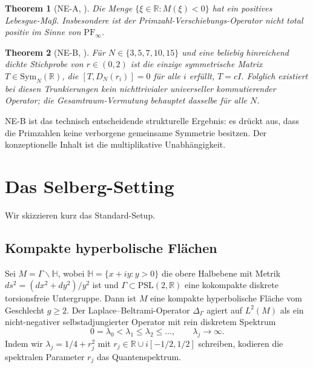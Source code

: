 \documentclass[12pt,a4paper]{article}
\newtheorem{theorem}{Theorem}[section]
\theoremstyle{definition}
\theoremstyle{remark}
\newcommand{\HH}{\mathbb{H}}
\newcommand{\RR}{\mathbb{R}}
\newcommand{\Delop}{\Delta_{\Gamma}}
\begin{document}
\begin{theorem}[NE-A, \cite{Geiger2026partII}]
\label{thm:NEA-riemann}
Die Menge $\{\xi \in \RR : M(\xi) < 0\}$ hat ein positives Lebesgue-Maß. Insbesondere
ist der Primzahl-Verschiebungs-Operator nicht total positiv im Sinne von $\mathrm{PF}_\infty$.
\end{theorem}

\begin{theorem}[NE-B, \cite{Geiger2026partII}]
\label{thm:NEB-riemann}
Für $N \in \{3,5,7,10,15\}$ und eine beliebig hinreichend dichte Stichprobe von $r \in (0,2)$
ist die einzige symmetrische Matrix $T \in \mathrm{Sym}_N(\RR)$, die
$[T, D_N(r_i)] = 0$ für alle $i$ erfüllt, $T = cI$. Folglich existiert bei diesen Trunkierungen
kein nichttrivialer universeller kommutierender Operator; die Gesamtraum-Vermutung
\cite[Conjecture~5.3]{Geiger2026partII} behauptet dasselbe für
alle $N$.
\end{theorem}

NE-B ist das technisch entscheidende strukturelle Ergebnis: es drückt aus, dass die
Primzahlen keine verborgene gemeinsame Symmetrie besitzen. Der konzeptionelle Inhalt ist
die multiplikative Unabhängigkeit.


\section{Das Selberg-Setting}
\label{sec:selberg-setting}

Wir skizzieren kurz das Standard-Setup.

\subsection{Kompakte hyperbolische Flächen}

Sei $M = \Gamma\backslash\HH$, wobei $\HH = \{x+iy : y > 0\}$ die obere
Halbebene mit Metrik $ds^2 = (dx^2+dy^2)/y^2$ ist und $\Gamma \subset \mathrm{PSL}(2,\RR)$
eine kokompakte diskrete torsionsfreie Untergruppe. Dann ist $M$ eine kompakte
hyperbolische Fläche vom Geschlecht $g \ge 2$. Der Laplace--Beltrami-Operator
$\Delop$ agiert auf $L^2(M)$ als ein nicht-negativer selbstadjungierter Operator mit
rein diskretem Spektrum
\begin{equation}
0 = \lambda_0 < \lambda_1 \le \lambda_2 \le \dots,\qquad \lambda_j \to \infty.
\end{equation}
Indem wir $\lambda_j = 1/4 + r_j^2$ mit $r_j \in \RR \cup i[-1/2, 1/2]$ schreiben, kodieren die
spektralen Parameter $r_j$ das Quantenspektrum.
\end{document}

